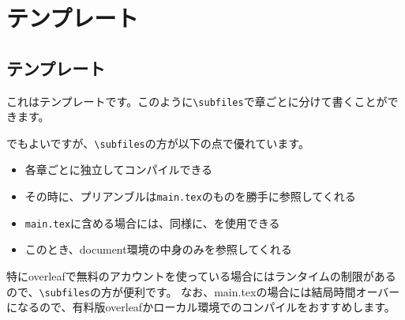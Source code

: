 \documentclass[../main/main.tex]{subfiles}
\begin{document}
\chapter{テンプレート} \label{chap:templete}
\section{テンプレート} \label{sec:templete}

これはテンプレートです。このように\verb|\subfiles|で章ごとに分けて書くことができます。

\verb|| でもよいですが、\verb|\subfiles|の方が以下の点で優れています。
\begin{itemize}
    \item 各章ごとに独立してコンパイルできる
    \item その時に、プリアンブルは\verb|main.tex|のものを勝手に参照してくれる
    \item \verb|main.tex|に含める場合には、\verb||同様に、\verb||を使用できる
    \item このとき、document環境の中身のみを参照してくれる
\end{itemize}

特にoverleafで無料のアカウントを使っている場合にはランタイムの制限があるので、\verb|\subfiles|の方が便利です。
なお、main.texの場合には結局時間オーバーになるので、有料版overleafかローカル環境でのコンパイルをおすすめします。
\end{document}
